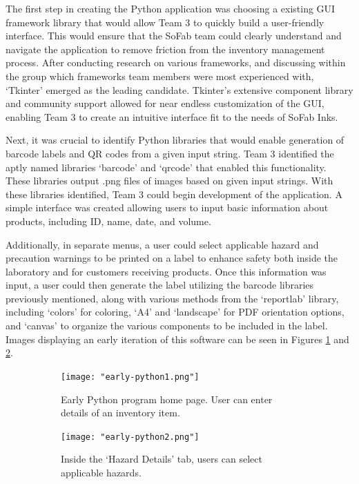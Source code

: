 \documentclass{article}
\begin{document}
The first step in creating the Python application was choosing a existing GUI framework library that would allow Team 3 to quickly 
build a user-friendly interface. This would ensure that the SoFab team could clearly understand and navigate the application to 
remove friction from the inventory management process. After conducting research on various frameworks, and discussing within the group
which frameworks team members were most experienced with, `Tkinter' emerged as the leading candidate. Tkinter's extensive component
library and community support allowed for near endless customization of the GUI, enabling Team 3 to create an intuitive interface
fit to the needs of SoFab Inks. 

Next, it was crucial to identify Python libraries that would enable generation of barcode labels and QR codes from a given input string. 
Team 3 identified the aptly named libraries `barcode' and `qrcode' that enabled this functionality. These libraries output .png files
of images based on given input strings. With these libraries identified, Team 3 could begin development of the application. A simple
interface was created allowing users to input basic information about products, including ID, name, date, and volume. 

Additionally, 
in separate menus, a user could select applicable hazard and precaution warnings to be printed on a label to enhance safety both inside
the laboratory and for customers receiving products. 
Once this information 
was input, a user could then generate the label utilizing the barcode libraries previously mentioned, along with various 
methods from the `reportlab' library, including `colors' for coloring, `A4' and `landscape' for PDF orientation options, and 
`canvas' to organize the various components to be included in the label. Images displaying an early iteration of this software can be 
seen in Figures \ref{fig:early-python1} and \ref{fig:early-python2}.

\begin{figure}[h!]
    \centering
    \begin{subfigure}[b]{.45\textwidth}
        \centering
        \texttt{[image: "early-python1.png"]}
        \caption{Early Python program home page. User can enter details of an inventory item.}
        \label{fig:early-python1}
    \end{subfigure}
    \begin{subfigure}[b]{.45\textwidth}
        \centering
        \texttt{[image: "early-python2.png"]}
        \caption{Inside the `Hazard Details' tab, users can select applicable hazards.}
        \label{fig:early-python2}
    \end{subfigure}
    \caption{}
    \label{fig:early-python}
\end{figure}
\FloatBarrier
\end{document}
